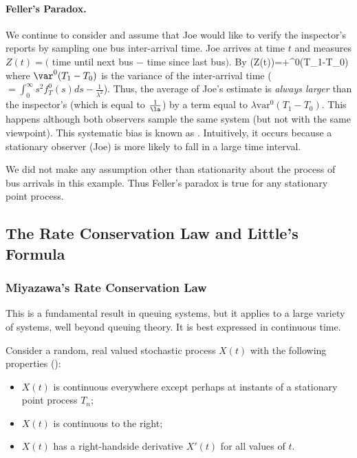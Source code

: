 \paragraph{Feller's Paradox.}
We continue to consider  and assume that Joe
would like to verify the inspector's reports by sampling one
bus inter-arrival time. Joe arrives at time $t$ and measures
$Z(t)=($ time until next bus $-$ time since last bus$)$. By
 \ben
\E(Z(t))=+\lambda \var^0(T_1-T_0)
 \een
where $\var^0(T_1-T_0)$ is the variance of the inter-arrival time
($=\int_{0}^{\infty} s^2 f^0_T(s) ds- \frac{1}{\lambda^2}$). Thus,
the average of Joe's estimate is {\em always larger} than the
inspector's (which is equal to $\frac{1}{\la}$) by a term equal to
$\lambda \mathrm{var}^0(T_1-T_0)$. This happens although both
observers sample the same system (but not with the same viewpoint).
This systematic bias is known as . Intuitively,
it occurs because a stationary observer (Joe) is more likely to fall
in a large time interval.

We did not make any assumption other than stationarity about the
process of bus arrivals in this example. Thus Feller's paradox is
true for any stationary point process.

\subsection{The Rate Conservation Law and Little's Formula}

\subsubsection{Miyazawa's Rate Conservation Law}
This is a fundamental result in queuing systems,
but it applies to a large variety of systems,
well beyond queuing theory. It is best expressed
in continuous time.

\begin{figure}[htb]
  \label{fig-palm-rcln}
\end{figure}

Consider a random, real valued stochastic process
$X(t)$ with the following properties
():
\begin{itemize}
    \item $X(t)$ is continuous everywhere except perhaps at
        instants of a stationary point process $T_n$;
    \item $X(t)$ is continuous to the right;
    \item $X(t)$ has a right-handside derivative $X'(t)$
        for all values of $t$.
\end{itemize}

